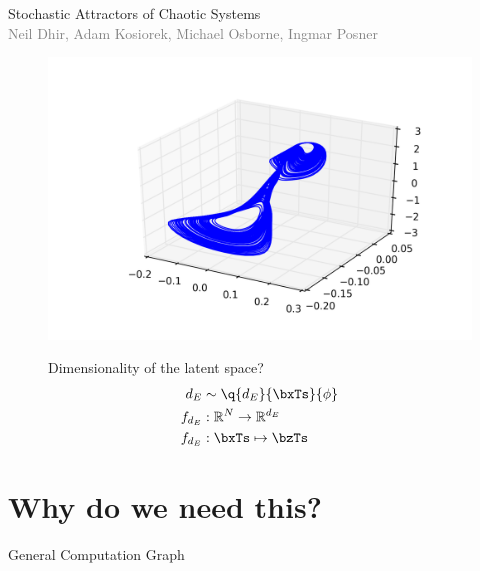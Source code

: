 \documentclass{beamer}
\newcommand{\layer}[4][$\sigma$]{%
	\node[rectangle, draw] (w#4) at (1.5 + #3, 1) {$\bW^{(#4)}$};
	\node  (z#4) at (1.5 + #3, 0) {$\bz^{(#4)}$};
	\node[rectangle, draw] (s#4) at (1.5 + #3, -1) {#1};
	\node (a#4) at (2.5 + #3, 0) {$\ba^{(#4)}$};

	\draw[->] (#2) to [out=90, in=180](w#4);
	\draw[->] (w#4) to (z#4);
	\draw[->] (z#4) to (s#4);
	\draw[->] (s#4) to [out=0, in=-90] (a#4);	
}
\begin{document}
\begin{frame}{Stochastic Attractors of Chaotic Systems\\ \textcolor{gray}{\tiny{Neil Dhir, Adam Kosiorek, Michael Osborne, Ingmar Posner}}}
\begin{figure}
\begin{minipage}{0.45\textwidth}
			\end{minipage}
			\hfill
			\begin{minipage}{0.45\textwidth}
				\includegraphics[width=\textwidth]{attractor6}
			\end{minipage}
			\hfill
			\begin{minipage}{0.45\textwidth}
				\centering
				Dimensionality of the latent space?
				\begin{equation*}
				\begin{aligned}
					d_E &\sim \q{d_E}{\bxTs}{\phi}\\
					f_{d_E} &: \RR^N \to \RR^{d_E}\\
					f_{d_E} &: \bxTs \mapsto \bzTs
				\end{aligned}
				\end{equation*}
			\end{minipage}
		\end{figure}
	\end{frame}

\section{Why do we need this?}

		\begin{frame}{General Computation Graph}
		\begin{figure}
			\centering
		\end{figure}
	\end{frame}
\end{document}
